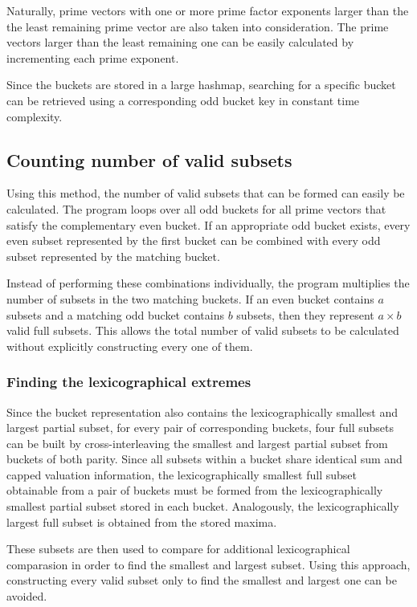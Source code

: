 \documentclass[11pt,a4paper]{article}
\begin{document}
Naturally, prime vectors with one or more prime factor exponents larger than the the least remaining prime vector are also taken into consideration. The prime vectors larger than the least remaining one can be easily calculated by incrementing each prime exponent.

Since the buckets are stored in a large hashmap, searching for a specific bucket can be retrieved using a corresponding odd bucket key in constant time complexity.

\subsection*{Counting number of valid subsets}

Using this method, the number of valid subsets that can be formed can easily be calculated. The program loops over all odd buckets for all prime vectors that satisfy the complementary even bucket. If an appropriate odd bucket exists, every even subset represented by the first bucket can be combined with every odd subset represented by the matching bucket.

Instead of performing these combinations individually, the program multiplies the number of subsets in the two matching buckets. If an even bucket contains $a$ subsets and a matching odd bucket contains $b$ subsets, then they represent $a\times b$ valid full subsets. This allows the total number of valid subsets to be calculated without explicitly constructing every one of them.

\subsubsection*{Finding the lexicographical extremes}

Since the bucket representation also contains the lexicographically smallest and largest partial subset, for every pair of corresponding buckets, four full subsets can be built by cross-interleaving the smallest and largest partial subset from buckets of both parity. Since all subsets within a bucket share identical sum and capped valuation information, the lexicographically smallest full subset obtainable from a pair of buckets must be formed from the lexicographically smallest partial subset stored in each bucket. Analogously, the lexicographically largest full subset is obtained from the stored maxima.

These subsets are then used to compare for additional lexicographical comparasion in order to find the smallest and largest subset. Using this approach, constructing every valid subset only to find the smallest and largest one can be avoided.
\end{document}
